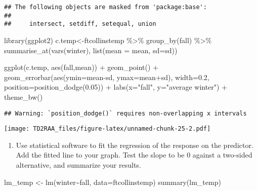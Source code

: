 \documentclass[
]{article}
\newenvironment{Shaded}{\begin{snugshade}}{\end{snugshade}}
\newcommand{\AttributeTok}[1]{\textcolor[rgb]{0.77,0.63,0.00}{#1}}
\newcommand{\FloatTok}[1]{\textcolor[rgb]{0.00,0.00,0.81}{#1}}
\newcommand{\FunctionTok}[1]{\textcolor[rgb]{0.00,0.00,0.00}{#1}}
\newcommand{\NormalTok}[1]{#1}
\newcommand{\OtherTok}[1]{\textcolor[rgb]{0.56,0.35,0.01}{#1}}
\newcommand{\SpecialCharTok}[1]{\textcolor[rgb]{0.00,0.00,0.00}{#1}}
\newcommand{\StringTok}[1]{\textcolor[rgb]{0.31,0.60,0.02}{#1}}
\providecommand{\tightlist}{%
  \setlength{\itemsep}{0pt}\setlength{\parskip}{0pt}}
\begin{document}
\begin{verbatim}
## The following objects are masked from 'package:base':
## 
##     intersect, setdiff, setequal, union
\end{verbatim}

\begin{Shaded}
\begin{Highlighting}[]
\FunctionTok{library}\NormalTok{(ggplot2)}
\NormalTok{c.temp}\OtherTok{\textless{}{-}}\NormalTok{ftcollinstemp }\SpecialCharTok{\%\textgreater{}\%}
  \FunctionTok{group\_by}\NormalTok{(fall) }\SpecialCharTok{\%\textgreater{}\%} 
  \FunctionTok{summarise\_at}\NormalTok{(}\FunctionTok{vars}\NormalTok{(winter), }\FunctionTok{list}\NormalTok{(}\AttributeTok{mean =}\NormalTok{ mean, }\AttributeTok{sd=}\NormalTok{sd))}

\FunctionTok{ggplot}\NormalTok{(c.temp, }\FunctionTok{aes}\NormalTok{(fall,mean)) }\SpecialCharTok{+} 
  \FunctionTok{geom\_point}\NormalTok{() }\SpecialCharTok{+}
  \FunctionTok{geom\_errorbar}\NormalTok{(}\FunctionTok{aes}\NormalTok{(}\AttributeTok{ymin=}\NormalTok{mean}\SpecialCharTok{{-}}\NormalTok{sd, }\AttributeTok{ymax=}\NormalTok{mean}\SpecialCharTok{+}\NormalTok{sd), }\AttributeTok{width=}\FloatTok{0.2}\NormalTok{, }
                \AttributeTok{position=}\FunctionTok{position\_dodge}\NormalTok{(}\FloatTok{0.05}\NormalTok{)) }\SpecialCharTok{+}
  \FunctionTok{labs}\NormalTok{(}\AttributeTok{x=}\StringTok{"fall"}\NormalTok{, }\AttributeTok{y=}\StringTok{"average winter"}\NormalTok{) }\SpecialCharTok{+} 
  \FunctionTok{theme\_bw}\NormalTok{()}
\end{Highlighting}
\end{Shaded}

\begin{verbatim}
## Warning: `position_dodge()` requires non-overlapping x intervals
\end{verbatim}

\texttt{[image: TD2RAA\_files/figure-latex/unnamed-chunk-25-2.pdf]}

\begin{enumerate}
\def\labelenumi{\alph{enumi}.}
\setcounter{enumi}{1}
\tightlist
\item
  Use statistical software to fit the regression of the response on the
  predictor. Add the fitted line to your graph. Test the slope to be 0
  against a two-sided alternative, and summarize your results.
\end{enumerate}

\begin{Shaded}
\begin{Highlighting}[]
\NormalTok{lm\_temp }\OtherTok{\textless{}{-}} \FunctionTok{lm}\NormalTok{(winter}\SpecialCharTok{\textasciitilde{}}\NormalTok{fall, }\AttributeTok{data=}\NormalTok{ftcollinstemp)}
\FunctionTok{summary}\NormalTok{(lm\_temp)}
\end{Highlighting}
\end{Shaded}
\end{document}
